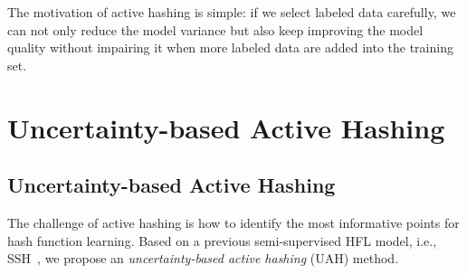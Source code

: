 The motivation of active hashing is simple: if we select labeled data carefully, we can not only reduce the model variance but also keep improving the model quality without impairing it when more labeled data are added into the training set.

\section{Uncertainty-based Active Hashing}
\label{AH:UAH}




%


\subsection{Uncertainty-based Active Hashing}
The challenge of active hashing is how to identify the most informative points for hash function learning. Based on a previous semi-supervised \mbox{HFL} model, i.e., \mbox{SSH}~\cite{wang2010cvpr}, we propose an \textit{uncertainty-based active hashing} (\mbox{UAH}) method.

